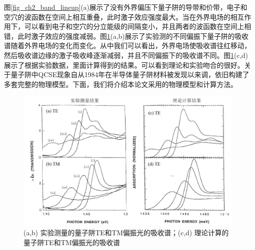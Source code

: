 图\ref{fig_ch2_band_lineup}(a)展示了没有外界偏压下量子阱的导带和价带，电子和空穴的波函数在空间上相互重叠，此时激子效应强度最大。当在外界电场的相互作用下，可以看到电子和空穴的分立能级的间隔变小，并且两者的波函数在空间上相错，此时激子效应的强度减弱。图\ref{fig_ch2_absorption_spec}(a,b)展示了实验测的不同偏振下量子阱的吸收谱随着外界电场的变化而变化\cite{chao1993momentum}。从中我们可以看出，外界电场使吸收谱往红移动，然后吸收谱边缘的激子吸收峰逐渐减弱，并且不同偏振下的吸收谱不同。图\ref{fig_ch2_absorption_spec}(c,d)展示了根据实验数据，里面计算得到的结果\cite{chao1993momentum}。可以看到理论和实验吻合的很好。关于量子阱中QCSE现象自从1984年在半导体量子阱材料被发现以来调\cite{miller1984band, wood1984high}，依旧构建了多套完整的物理模型\cite{chuang1995physics}。下面，我们将介绍本论文采用的物理模型和计算方法。
\begin{figure}[htb]
	\centering
	\includegraphics[width=14cm]{./Pictures/fig_ch2_absorption_spec.jpg}
	\caption{ (a,b) 实验测量的量子阱TE和TM偏振光的吸收谱\cite{chao1993momentum}；(c,d) 理论计算的量子阱TE和TM偏振光的吸收谱\cite{chao1993momentum}}
	\label{fig_ch2_absorption_spec}
\end{figure}

